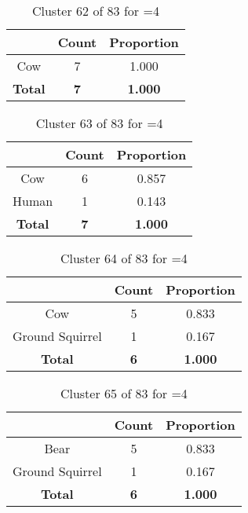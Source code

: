 \begin{table}[ht!]
\centering
\begin{tabular}{|c|c|c|}
\hline
\bf \Spec{} &\bf Count &\bf Proportion\\ \hline \hline
Cow & 7 & 1.000\\ \hline
\hline
\bf Total & \bf 7 & \bf 1.000\\ \hline
\end{tabular}
\label{tab:cluster:62:4}
\caption{Cluster 62 of 83 for \minneigh{}=4}
\end{table}

\begin{table}[ht!]
\centering
\begin{tabular}{|c|c|c|}
\hline
\bf \Spec{} &\bf Count &\bf Proportion\\ \hline \hline
Cow & 6 & 0.857\\ \hline
Human & 1 & 0.143\\ \hline
\hline
\bf Total & \bf 7 & \bf 1.000\\ \hline
\end{tabular}
\label{tab:cluster:63:4}
\caption{Cluster 63 of 83 for \minneigh{}=4}
\end{table}

\begin{table}[ht!]
\centering
\begin{tabular}{|c|c|c|}
\hline
\bf \Spec{} &\bf Count &\bf Proportion\\ \hline \hline
Cow & 5 & 0.833\\ \hline
Ground Squirrel & 1 & 0.167\\ \hline
\hline
\bf Total & \bf 6 & \bf 1.000\\ \hline
\end{tabular}
\label{tab:cluster:64:4}
\caption{Cluster 64 of 83 for \minneigh{}=4}
\end{table}

\begin{table}[ht!]
\centering
\begin{tabular}{|c|c|c|}
\hline
\bf \Spec{} &\bf Count &\bf Proportion\\ \hline \hline
Bear & 5 & 0.833\\ \hline
Ground Squirrel & 1 & 0.167\\ \hline
\hline
\bf Total & \bf 6 & \bf 1.000\\ \hline
\end{tabular}
\label{tab:cluster:65:4}
\caption{Cluster 65 of 83 for \minneigh{}=4}
\end{table}

